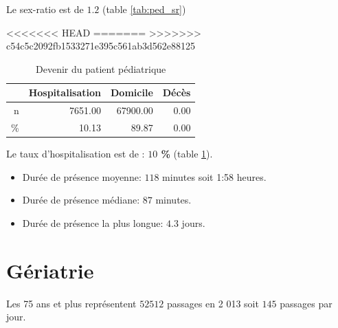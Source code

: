 \documentclass[12pt,english,french,twoside]{book}\usepackage[]{graphicx}\usepackage[]{color}
\begin{document}
Le sex-ratio est de $1.2$ (table \ref{tab:ped_sr})


<<<<<<< HEAD
=======
>>>>>>> c54c5c2092fb1533271e395c561ab3d562e88125
\begin{table}[ht]
\centering
\begin{tabular}{rrrr}
  \hline
 & Hospitalisation & Domicile & Décès \\ 
  \hline
n & 7651.00 & 67900.00 & 0.00 \\ 
  \% & 10.13 & 89.87 & 0.00 \\ 
   \hline
\end{tabular}
\caption[Devenir du patient pédiatrique]{Devenir du patient pédiatrique} 
\label{tab:ped_hosp}
\end{table}



Le taux d'hospitalisation est de : \textbf{$10$ \%} (table \ref{tab:ped_hosp}).





\begin{itemize}
  \item Durée de présence moyenne: $118$ minutes soit 1:58 heures.
  \item Durée de présence médiane: $87$ minutes.
  \item Durée de présence la plus longue: $4.3$ jours.
\end{itemize}

\chapter{Gériatrie}






Les 75 ans et plus représentent $52 512$ passages en 2 013 soit $145$ passages par jour.

\end{document}
